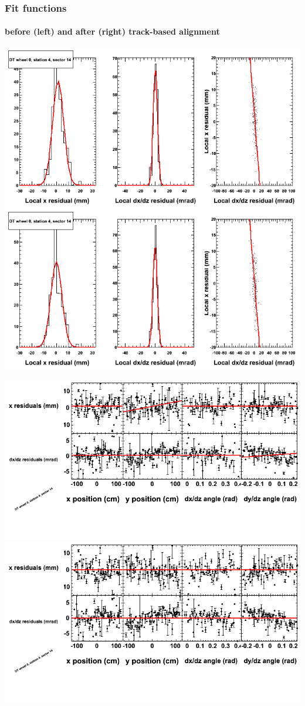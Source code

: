 \documentclass[compress]{beamer}
\begin{document}
\begin{frame}
\frametitle{Fit functions}
\framesubtitle{before (left) and after (right) track-based alignment}
\includegraphics[width=0.5\linewidth]{fitfunctions_re01/MBwhCst4sec14_bellcurves.png} \includegraphics[width=0.5\linewidth]{fitfunctions_re05/MBwhCst4sec14_bellcurves.png}

\includegraphics[width=0.5\linewidth]{fitfunctions_re01/MBwhCst4sec14_polynomials.png} \includegraphics[width=0.5\linewidth]{fitfunctions_re05/MBwhCst4sec14_polynomials.png}
\end{frame}
\end{document}
